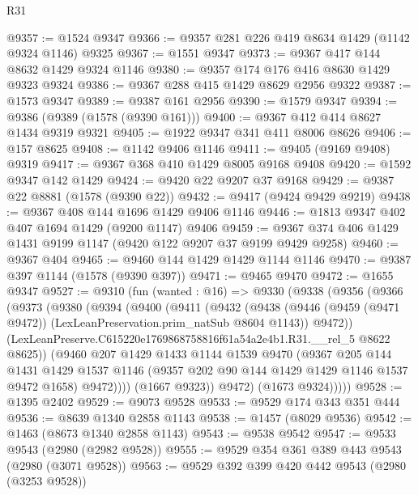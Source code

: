 \begin{lexlean}{R31}
\begin{coremodule}
@9357 := @1524 @9347
@9366 := @9357 @281 @226 @419 @8634 @1429 (@1142 @9324 @1146) @9325
@9367 := @1551 @9347
@9373 := @9367 @417 @144 @8632 @1429 @9324 @1146
@9380 := @9357 @174 @176 @416 @8630 @1429 @9323 @9324
@9386 := @9367 @288 @415 @1429 @8629 @2956 @9322
@9387 := @1573 @9347
@9389 := @9387 @161 @2956
@9390 := @1579 @9347
@9394 := @9386 (@9389 (@1578 (@9390 @161)))
@9400 := @9367 @412 @414 @8627 @1434 @9319 @9321
@9405 := @1922 @9347 @341 @411 @8006 @8626
@9406 := @157 @8625
@9408 := @1142 @9406 @1146
@9411 := @9405 (@9169 @9408) @9319
@9417 := @9367 @368 @410 @1429 @8005 @9168 @9408
@9420 := @1592 @9347 @142 @1429
@9424 := @9420 @22 @9207 @37 @9168
@9429 := @9387 @22 @8881 (@1578 (@9390 @22))
@9432 := @9417 (@9424 @9429 @9219)
@9438 := @9367 @408 @144 @1696 @1429 @9406 @1146
@9446 := @1813 @9347 @402 @407 @1694 @1429 (@9200 @1147) @9406
@9459 := @9367 @374 @406 @1429 @1431 @9199 @1147 (@9420 @122 @9207 @37 @9199 @9429 @9258)
@9460 := @9367 @404
@9465 := @9460 @144 @1429 @1429 @1144 @1146
@9470 := @9387 @397 @1144 (@1578 (@9390 @397))
@9471 := @9465 @9470
@9472 := @1655 @9347
@9527 := @9310
    (fun (wanted : @16) =>
    @9330
      (@9338
        (@9356
          (@9366
            (@9373
              (@9380
                (@9394
                  (@9400
                    (@9411
                      (@9432
                        (@9438
                          (@9446
                            (@9459 (@9471 @9472))
                            (LexLeanPreservation.prim_natSub @8604 @1143))
                          @9472))
                      (LexLeanPreserve.C615220e1769868758816f61a54a2e4b1.R31.__rel_5 @8622 @8625))
                    (@9460
                      @207
                      @1429
                      @1433
                      @1144
                      @1539
                      @9470
                      (@9367
                        @205
                        @144
                        @1431
                        @1429
                        @1537
                        @1146
                        (@9357 @202 @90 @144 @1429 @1429 @1146 @1537 @9472 @1658)
                        @9472))))
                (@1667 @9323))
              @9472)
            (@1673 @9324)))))
@9528 := @1395 @2402
@9529 := @9073 @9528
@9533 := @9529 @174 @343 @351 @444
@9536 := @8639 @1340 @2858 @1143
@9538 := @1457 (@8029 @9536)
@9542 := @1463 (@8673 @1340 @2858 @1143)
@9543 := @9538 @9542
@9547 := @9533 @9543 (@2980 (@2982 @9528))
@9555 := @9529 @354 @361 @389 @443 @9543 (@2980 (@3071 @9528))
@9563 := @9529 @392 @399 @420 @442 @9543 (@2980 (@3253 @9528))

\end{coremodule}
\end{lexlean}
